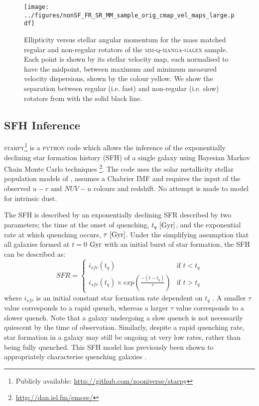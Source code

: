 \documentclass[useAMS,usenatbib]{mn2e}
\begin{document}
\begin{figure}
\centering
\texttt{[image: ../figures/nonSF\_FR\_SR\_MM\_sample\_orig\_cmap\_vel\_maps\_large.pdf]}
\caption{Ellipticity versus stellar angular momentum for the mass matched regular and non-regular rotators of the \textsc{mm-q-manga-galex} sample. Each point is shown by its stellar velocity map, each normalised to have the midpoint, between maximum and minimum measured velocity dispersions, shown by the colour yellow. We show the separation between regular (i.e. fast) and non-regular (i.e. slow) rotators from \protect\cite{cappellari16} with the solid black line.}
\label{fig:evsl}
\end{figure}


\subsection{SFH Inference}\label{sec:starpy}

\textsc{starpy}\footnote{Publicly available: \url{http://github.com/zooniverse/starpy}} is a \textsc{python} code which allows the inference of the exponentially declining star formation history (SFH) of a single galaxy using  Bayesian Markov Chain Monte Carlo techniques \citep{emcee13}\footnote{\url{http://dan.iel.fm/emcee/}}. The code uses the solar metallicity stellar population models of \cite[][hereafter BC03]{BC03}, assumes a Chabrier IMF \citep{chabrier03} and requires the input of the observed $u-r$ and $NUV-u$ colours and redshift. No attempt is made to model for intrinsic dust. 

The SFH is described by an exponentially declining SFR described by two parameters; the time at the onset of quenching, $t_q~\rm{[Gyr]}$, and the exponential rate at which quenching occurs, $\tau~\rm{[Gyr]}$. Under the simplifying assumption that all galaxies formed at $t=0$ $\rm{ Gyr}$ with an initial burst of star formation, the SFH can be described as:
\begin{equation}\label{sfh}
SFR =
\begin{cases}
i_{sfr}(t_q) & \text{if } t < t_q \\
i_{sfr}(t_q) \times exp{\left( \frac{-(t-t_{q})}{\tau}\right)} & \text{if } t > t_q 
\end{cases}
\end{equation}
where $i_{sfr}$ is an initial constant star formation rate dependent on $t_q$ \citep{schawinski14, smethurst15}.  A smaller $\tau$ value corresponds to a rapid quench, whereas a larger $\tau$ value corresponds to a slower quench. Note that a galaxy undergoing a slow quench is not necessarily quiescent by the time of observation. Similarly, despite a rapid quenching rate, star formation in a galaxy may still be ongoing at very low rates, rather than being fully quenched. This SFH model has previously been shown to appropriately characterise quenching galaxies \citep{Weiner06, Martin07, Noeske07,schawinski14}. 
\end{document}
